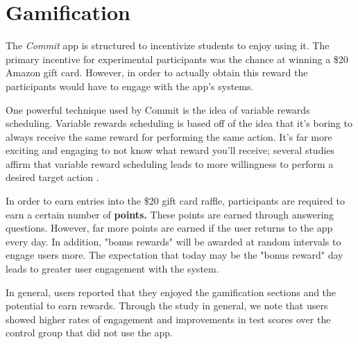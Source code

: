 \section{Gamification}
\par The \textit{Commit} app is structured to incentivize students to enjoy using it. The primary incentive for experimental participants was the chance at winning a \$20 Amazon gift card. However, in order to actually obtain this reward the participants would have to engage with the app's systems.

\par One powerful technique used by Commit is the idea of variable rewards scheduling. Variable rewards scheduling is based off of the idea that it's boring to always receive the same reward for performing the same action. It's far more exciting and engaging to not know what reward you'll receive; several studies affirm that variable reward scheduling leads to more willingness to perform a desired target action \cite{dodin2001integrated}.

\par In order to earn entries into the \$20 gift card raffle, participants are required to earn a certain number of \textbf{points.} These points are earned through answering questions. However, far more points are earned if the user returns to the app every day. In addition, "bonus rewards" will be awarded at random intervals to engage users more. The expectation that today may be the "bonus reward" day leads to greater user engagement with the system.

\par In general, users reported that they enjoyed the gamification sections and the potential to earn rewards. Through the study in general, we note that users showed higher rates of engagement and improvements in test scores over the control group that did not use the app.